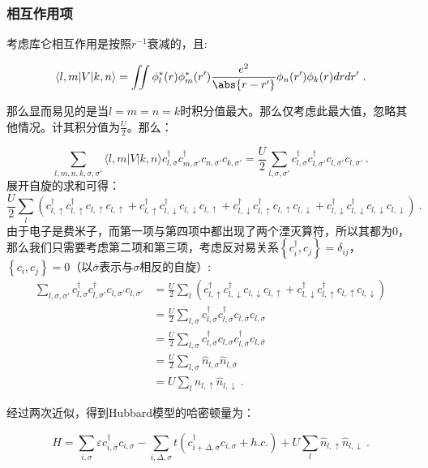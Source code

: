 \subsubsection{相互作用项}

考虑库仑相互作用是按照$r^{-1}$衰减的，且:

$$\langle l,m|V|k,n\rangle=\iint \phi_l^*(r)\phi_m^*(r')\frac{e^2}{\abs{r-r'}}\phi_n(r')\phi_k(r)drdr'~.$$

那么显而易见的是当$l=m=n=k$时积分值最大。那么仅考虑此最大值，忽略其他情况。计其积分值为$\frac{U}{2}$。那么：

\begin{equation}
\sum\limits_{l,m,n,k,\sigma,\sigma'}\langle l,m|V|k,n\rangle c_{l,\sigma}^\dagger c_{m,\sigma'}^\dagger c_{n,\sigma'}c_{k,\sigma'}=\frac{U}{2}\sum\limits_{l,\sigma,\sigma'}c_{l,\sigma}^\dagger c_{l,\sigma'}^\dagger c_{l,\sigma'}c_{l,\sigma'}~.
\end{equation}
展开自旋的求和可得：
\begin{equation}
\frac{U}{2}\sum\limits_l \left(c_{l,\uparrow}^\dagger c_{l,\uparrow}^\dagger c_{l,\uparrow}c_{l,\uparrow}+c_{l,\uparrow}^\dagger c_{l,\downarrow}^\dagger c_{l,\downarrow}c_{l,\uparrow}+c_{l,\downarrow}^\dagger c_{l,\uparrow}^\dagger c_{l,\uparrow}c_{l,\downarrow}+c_{l,\downarrow}^\dagger c_{l,\downarrow}^\dagger c_{l,\downarrow}c_{l,\downarrow}\right)~.
\end{equation}
由于电子是费米子，而第一项与第四项中都出现了两个湮灭算符，所以其都为0，那么我们只需要考虑第二项和第三项，考虑反对易关系$\left\{c_i^\dagger,c_j\right\}=\delta_{ij}$，$\left\{c_i,c_j\right\}=0$（以$\bar{\sigma}$表示与$\sigma$相反的自旋）:
\begin{equation}
\begin{aligned}
\sum\limits_{l,\sigma,\sigma'}c_{l,\sigma}^\dagger c_{l,\sigma'}^\dagger c_{l,\sigma'}c_{l,\sigma'}&=\frac{U}{2}\sum\limits_l \left(c_{l,\uparrow}^\dagger c_{l,\downarrow}^\dagger c_{l,\downarrow}c_{l,\uparrow}+c_{l,\downarrow}^\dagger c_{l,\uparrow}^\dagger c_{l,\uparrow}c_{l,\downarrow}\right) \\
&=\frac{U}{2}\sum\limits_{l,\sigma}c_{l,\sigma}^\dagger c_{l,\bar\sigma}^\dagger c_{l,\bar\sigma} c_{l,\sigma} \\
&=\frac{U}{2}\sum\limits_{l,\sigma}c_{l,\sigma}^\dagger c_{l,\sigma} c_{l,\bar\sigma}^\dagger c_{l,\bar\sigma} \\
&=\frac{U}{2}\sum\limits_{l,\sigma}\hat{n}_{l,\sigma} \hat{n}_{l,\bar{\sigma}} \\
&=U\sum\limits_{l}\hat{n}_{l,\uparrow}\hat{n}_{l,\downarrow}
~.
\end{aligned}
\end{equation}

经过两次近似，得到Hubbard模型的哈密顿量为：

\begin{equation}
H=\sum\limits_{i,\sigma}\varepsilon c_{i,\sigma}^\dagger c_{i,\sigma}-\sum\limits_{i,\Delta,\sigma}t\left(c_{i+\Delta,\sigma}^\dagger c_{i,\sigma}+h.c.\right)+U\sum\limits_{l}\hat{n}_{l,\uparrow}\hat{n}_{l,\downarrow}~.
\end{equation}
